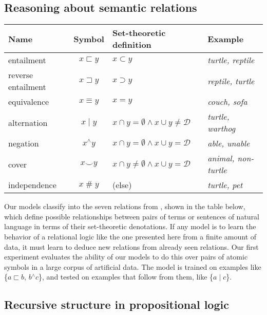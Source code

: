 \documentclass{article} %
\newcommand{\nateq}{\equiv}
\newcommand{\natind}{\mathbin{\#}}
\newcommand{\natneg}{\mathbin{^{\wedge}}}
\newcommand{\natfor}{\sqsubset}
\newcommand{\natrev}{\sqsupset}
\newcommand{\natalt}{\mathbin{|}}
\newcommand{\natcov}{\mathbin{\smallsmile}}
\def\ii#1{\textit{#1}}
\begin{document}
\subsection*{Reasoning about semantic relations}

\begin{table}[h]
  \centering
  \setlength{\tabcolsep}{15pt}
  \renewcommand{\arraystretch}{1.1}
  \begin{tabular}{l c l l} 
    \toprule
    Name & Symbol & Set-theoretic definition & Example \\ 
    \midrule
    entailment         & $x \natfor y$   & $x \subset y$ & \ii{turtle, reptile}  \\ 
    reverse entailment & $x \natrev y$   & $x \supset y$ & \ii{reptile, turtle}  \\ 
    equivalence        & $x \nateq y$    & $x = y$       & \ii{couch, sofa} \\ 
    alternation        & $x \natalt y$   & $x \cap y = \emptyset \wedge x \cup y \neq \mathcal{D}$ & \ii{turtle, warthog} \\ 
    negation           & $x \natneg y$   & $x \cap y = \emptyset \wedge x \cup y = \mathcal{D}$    & \ii{able, unable} \\
    cover              & $x \natcov y$   & $x \cap y \neq \emptyset \wedge x \cup y = \mathcal{D}$ & \ii{animal, non-turtle} \\ 
    independence       & $x \natind y$   & (else) & \ii{turtle, pet}\\
    \bottomrule
  \end{tabular}
  \label{b-table}
\end{table}
 
Our models classify into the seven relations from \cite{maccartney2009extended}, shown in the table below, which define possible relationships between pairs of terms or sentences of natural language in terms of their set-theoretic denotations.
If any model is to learn the behavior of a relational logic like the one
presented here from a finite amount of data, it must learn to deduce new
relations from already seen relations. Our first experiment evaluates the ability of our models to do this over pairs of atomic symbols in a large corpus of artificial data. The model is trained on examples like \{$a \natfor b$, $b \natneg c$\}, and tested on examples that follow from them, like \{$a \natalt c$\}.

\subsection*{Recursive structure in propositional logic}\label{sec:recursion}
\end{document}
